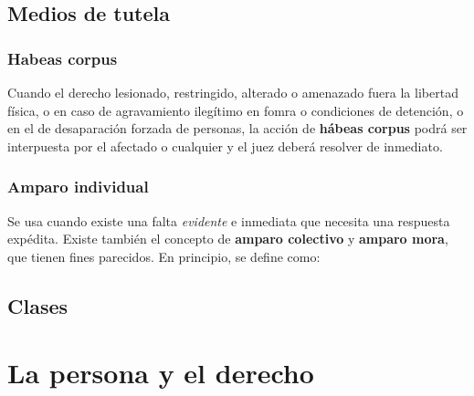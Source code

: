 \documentclass[../resumen.tex]{subfiles}
\begin{document}
\subsection{Medios de tutela}

\subsubsection{Habeas corpus}

Cuando el derecho lesionado, restringido, alterado o amenazado fuera la libertad 
física, o en caso de agravamiento ilegítimo en fomra o condiciones de detención,
o en el de desaparación forzada de personas, la acción de \textbf{hábeas corpus} 
podrá ser interpuesta por el afectado o cualquier y el juez deberá resolver de 
inmediato.

\subsubsection{Amparo individual}

Se usa cuando existe una falta \textit{evidente} e inmediata que necesita una 
respuesta expédita. Existe también el concepto de \textbf{amparo colectivo} y
\textbf{amparo mora}, que tienen fines parecidos. En principio, se define como:

\space{0.3cm}
\begin{center}
\end{center}
\vspace{0.3cm}

\subsection{Clases}


\section{La persona y el derecho}
\end{document}
